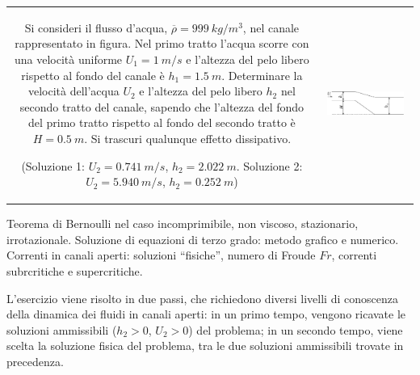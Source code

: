 \noindent
\begin{tabular}{cc}
\begin{minipage}[b]{0.60\textwidth}
\begin{exerciseS}
Si consideri il flusso d'acqua, $\overline{\rho}=999\ kg/m^3$, 
nel canale rappresentato in figura.
Nel primo tratto l'acqua scorre con una velocit\`{a} uniforme 
$U_1 = 1\ m/s$  e l'altezza del pelo libero rispetto al fondo 
del canale \`e $h_1 = 1.5\ m$. Determinare la velocit\`{a}
dell'acqua $U_2$ e l'altezza del pelo libero $h_2$ nel secondo tratto 
del canale, sapendo che l'altezza del fondo del primo tratto rispetto al fondo
del secondo tratto \`{e} $H=0.5\ m$. Si trascuri qualunque effetto
dissipativo.

(Soluzione 1: $U_2 = 0.741\ m/s$, $h_2 = 2.022\ m$.
Soluzione 2: $U_2 = 5.940\ m/s$, $h_2 = 0.252\ m$)
\end{exerciseS}
\end{minipage}
&
\begin{minipage}{0.35\textwidth}
   \begin{center}
   \includegraphics[width=0.90\textwidth]{./fig/canale.eps}
   \end{center}
\end{minipage}
\end{tabular}

\sol

\partone
Teorema di Bernoulli nel caso incomprimibile, non viscoso, stazionario, irrotazionale.
Soluzione di equazioni di terzo grado: metodo grafico e numerico. 
Correnti in canali aperti: soluzioni ``fisiche'', numero di Froude $Fr$,
 correnti subrcritiche e supercritiche.

\parttwo

L'esercizio viene risolto in due passi, che richiedono diversi livelli di
 conoscenza della dinamica dei fluidi in canali aperti: in un primo tempo,
 vengono ricavate le soluzioni ammissibili ($h_2 > 0$, $U_2 > 0$) del 
 problema; in un secondo tempo, viene scelta la soluzione fisica del
 problema, tra le due soluzioni ammissibili trovate in precedenza.

